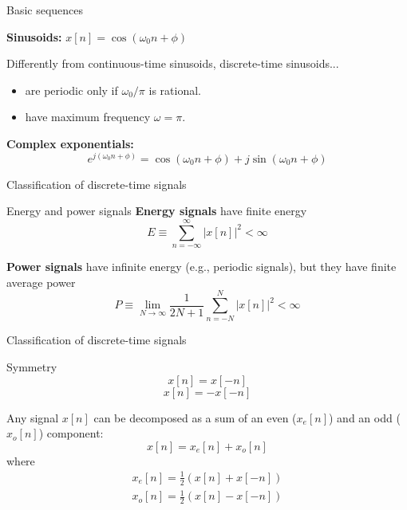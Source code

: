 \documentclass[10pt, aspectratio=169]{beamer}
\begin{document}
%
\begin{frame}{Basic sequences}
	
	\textbf{Sinusoids:} $\displaystyle
	x[n] = \cos(\omega_0 n + \phi)$
	\vspace{-0.2cm}
	\begin{figure}[t!]
		\centering
		\resizebox{0.3\linewidth}{!}{}
		\label{fig:sinusoid}
	\end{figure}

	Differently from continuous-time sinusoids, discrete-time sinusoids...
	\begin{itemize}
		\item are periodic only if $\omega_0/\pi$ is rational.
		\item have maximum frequency $\omega = \pi$.
	\end{itemize}
	
	\pause	
	\textbf{Complex exponentials:} 
	\begin{equation*}
		e^{j(\omega_0n + \phi)} = \cos(\omega_0 n + \phi) + j\sin(\omega_0 n + \phi) \tag{from Euler's equation}
	\end{equation*}
\end{frame}

%
\begin{frame}{Classification of discrete-time signals}
\begin{block}{Energy and power signals}
	\textbf{Energy signals} have finite energy
	\begin{equation*}
		E \equiv \sum_{n=-\infty}^{\infty} |x[n]|^2 < \infty
	\end{equation*}
	
	\textbf{Power signals} have infinite energy (e.g., periodic signals), but they have finite average power
	\begin{equation*}
		P \equiv \lim_{N\to\infty}\frac{1}{2N+1}\sum_{n=-N}^{N} |x[n]|^2 < \infty
	\end{equation*}	
\end{block}	
\end{frame}

%
\begin{frame}{Classification of discrete-time signals}
\begin{block}{Symmetry}
	\begin{equation*}
	x[n] = x[-n] \tag{even symmetry}
	\end{equation*}
	\begin{equation*}
	x[n] = -x[-n] \tag{odd symmetry}
	\end{equation*}
	
	Any signal $x[n]$ can be decomposed as a sum of an even ($x_e[n]$) and an odd ($x_o[n]$) component:
	\begin{equation*}
	x[n] = x_e[n] + x_o[n]
	\end{equation*}	
	where 
	\begin{align}
	x_e[n] = \frac{1}{2}(x[n] + x[-n]) \tag{even component} \\
	x_o[n] = \frac{1}{2}(x[n] - x[-n]) \tag{odd component}
	\end{align}
\end{block}	
\end{frame}
\end{document}
